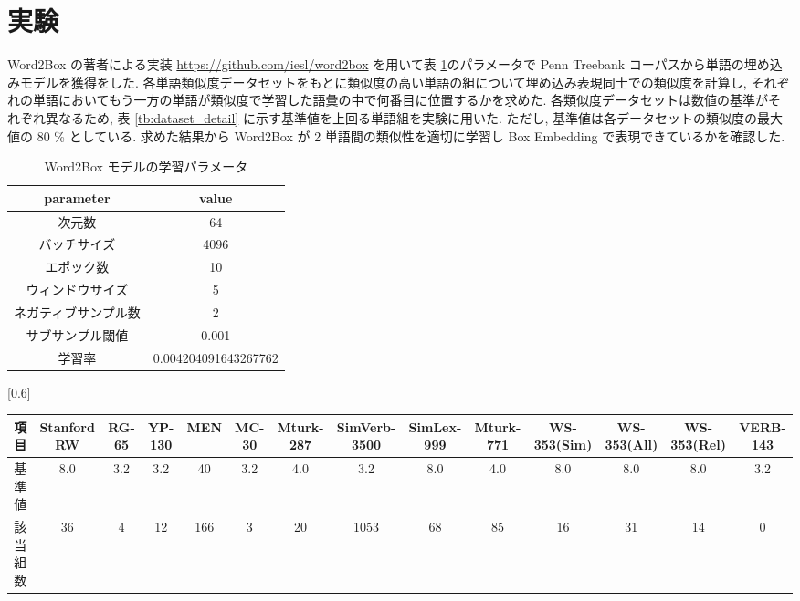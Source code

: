 \documentclass[twocolumn]{jarticle}     %
\begin{document}
\section{実験}
Word2Box の著者による実装 \url{https://github.com/iesl/word2box} を用いて表 \ref{tb:model_parameter}のパラメータで Penn Treebank コーパスから単語の埋め込みモデルを獲得をした. 
各単語類似度データセットをもとに類似度の高い単語の組について埋め込み表現同士での類似度を計算し, それぞれの単語においてもう一方の単語が類似度で学習した語彙の中で何番目に位置するかを求めた. 
各類似度データセットは数値の基準がそれぞれ異なるため, 表 \ref{tb:dataset_detail} に示す基準値を上回る単語組を実験に用いた. 
ただし, 基準値は各データセットの類似度の最大値の 80 \% としている. 
求めた結果から Word2Box が 2 単語間の類似性を適切に学習し Box Embedding で表現できているかを確認した. 

\begin{table}[t]
  \centering
  \caption{Word2Box モデルの学習パラメータ}
  \label{tb:model_parameter}
  \begin{tabular}{c|c} \hline
      parameter&value \\ \hline
      次元数&64 \\
      バッチサイズ&4096 \\ 
      エポック数&10 \\
      ウィンドウサイズ&5 \\
      ネガティブサンプル数&2 \\
      サブサンプル閾値&0.001 \\
      学習率&0.004204091643267762 \\
      \hline
  \end{tabular}
\end{table}

\begin{table*}[th]
  \centering
  \caption{類似度データセットから抽出した単語組}
  \label{tb:dataset_detail}
  \scalebox{0.6}[0.6]{
		\begin{tabular}{c|ccccccccccccc}
			\hline
			項目   & Stanford RW & RG-65 & YP-130 & MEN & MC-30 & Mturk-287 & SimVerb-3500 & SimLex-999 & Mturk-771 & WS-353(Sim) & WS-353(All) & WS-353(Rel) & VERB-143 \\ \hline
			基準値  & 8.0         & 3.2   & 3.2    & 40  & 3.2   & 4.0       & 3.2          & 8.0        & 4.0       & 8.0         & 8.0         & 8.0         & 3.2      \\
			該当組数 & 36          & 4     & 12     & 166 & 3     & 20        & 1053         & 68         & 85        & 16          & 31          & 14          & 0        \\ \hline
			\end{tabular}
  }
\end{table*}
\end{document}
